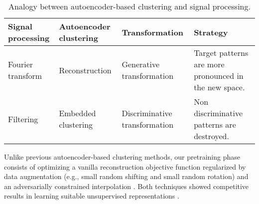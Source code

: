 \documentclass{article}
\begin{document}
\begin{table}[htb]
\caption {Analogy between autoencoder-based clustering and signal processing.}
\label{table:1}
\begin{center}
\begin{small}
\begin{tabular}{ |>{\centering\arraybackslash}m{2.1cm}|>{\centering\arraybackslash}m{3.5cm}|>{\centering\arraybackslash}m{3cm}|>{\centering\arraybackslash}m{3cm}|}
        \hline
        \textbf{Signal \newline processing}  & \textbf{Autoencoder clustering}  & \textbf{Transformation} &  \textbf{Strategy}  \\ \hline
        Fourier \newline transform & Reconstruction & Generative \newline transformation & Target patterns are more pronounced in the new space. 
        \\ \hline
        Filtering & Embedded clustering & Discriminative \newline transformation & Non discriminative patterns are destroyed.
        \\ \hline
    \end{tabular}
\end{small}
\end{center}
\end{table}

Unlike previous autoencoder-based clustering methods, our pretraining phase consists of optimizing a vanilla reconstruction objective function regularized by data augmentation (e.g., small random shifting and small random rotation) \cite{paper34} and an adversarially constrained interpolation \cite{paper5}. Both techniques showed competitive results in learning suitable unsupervised representations \cite{paper34, paper5}. 
\end{document}
